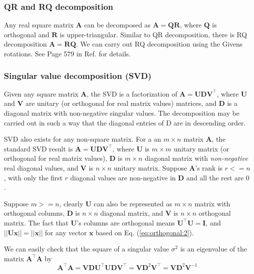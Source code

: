 \documentclass[12pt]{article}
\numberwithin{equation}{section}
\begin{document}
\subsubsection{QR and RQ decomposition}
\label{sec:rq}

Any real square matrix $\mathbf{A}$ can be decomposed as $\mathbf{A} = \mathbf{QR}$, where $\mathbf{Q}$ is orthogonal and $\mathbf{R}$ is upper-triangular. Similar to QR decomposition, there is RQ decomposition $\mathbf{A} = \mathbf{RQ}$. We can carry out RQ decomposition using the Givens rotations. See Page 579 in Ref. \citep{hartley2003multiple} for details.

\subsubsection{Singular value decomposition (SVD)}

Given any square matrix $\mathbf{A}$, the SVD is a factorization of $\mathbf{A = UDV}^{\top}$, where $\mathbf{U}$ and $\mathbf{V}$ are unitary (or orthogonal for real matrix values) matrices, and $\mathbf{D}$ is a diagonal matrix with non-negative singular values. The decomposition
may be carried out in such a way that the diagonal entries of D are in descending order.

SVD also exists for any non-square matrix. For a an $m \times n$ matrix $\mathbf{A}$, the standard SVD result is $\mathbf{A = UDV}^{\top}$, where $\mathbf{U}$ is $m \times m$ unitary matrix (or orthogonal for real matrix values), $\mathbf{D}$ is $m \times n$ diagonal matrix with \textit{non-negative} real diagonal values, and $\mathbf{V}$ is $n \times n$ unitary matrix. Suppose $\mathbf{A}$'s rank is $r <= n$, with only the first $r$ diagonal values are non-negative in $\mathbf{D}$ and all the rest are $0$.

Suppose $m >= n$, clearly $\mathbf{U}$ can also be represented as $m \times n$ matrix with orthogonal columns, $\mathbf{D}$ is $n \times n$ diagonal matrix, and $\mathbf{V}$ is $n \times n$ orthogonal matrix. The fact that $\mathbf{U}$'s columns are orthogonal means $\mathbf{U}^\top\mathbf{U} = \mathbf{I}$, and $||\mathbf{Ux}|| = ||\mathbf{x}||$ for any vector $\mathbf{x}$ based on Eq. (\ref{eq:orthogonal:2}).

We can easily check that the square of a singular value $\sigma^2$ is an eigenvalue of the matrix $\mathbf{A^\top A}$ by
\begin{equation*}
\mathbf{A^\top A} = \mathbf{VDU^\top UDV^\top} = \mathbf{VD}^2\mathbf{V}^\top = \mathbf{VD}^2\mathbf{V}^{-1}
\end{equation*}
\end{document}
